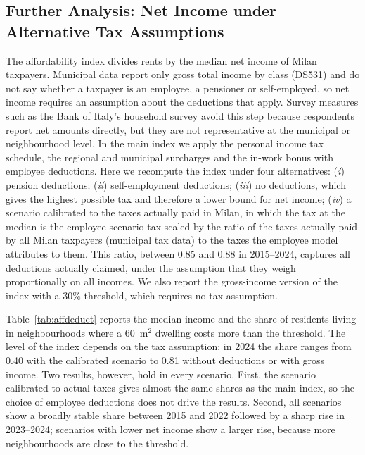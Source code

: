 
\subsection*{Further Analysis: Net Income under Alternative Tax Assumptions}

The affordability index divides rents by the median net income of Milan taxpayers. %
Municipal data report only gross total income by class (DS531) and do not say whether a taxpayer is an employee, a pensioner or self-employed, so net income requires an assumption about the deductions that apply. Survey measures such as the Bank of Italy's household survey avoid this step because respondents report net amounts directly, but they are not representative at the municipal or neighbourhood level. In the main index we apply the personal income tax schedule, the regional and municipal surcharges and the in-work bonus with employee deductions. Here we recompute the index under four alternatives: (\textit{i}) pension deductions; (\textit{ii}) self-employment deductions; (\textit{iii}) no deductions, which gives the highest possible tax and therefore a lower bound for net income; (\textit{iv}) a scenario calibrated to the taxes actually paid in Milan, in which the tax at the median is the employee-scenario tax scaled by the ratio of the taxes actually paid by all Milan taxpayers (municipal tax data) to the taxes the employee model attributes to them. This ratio, between 0.85 and 0.88 in 2015--2024, captures all deductions actually claimed, under the assumption that they weigh proportionally on all incomes. We also report the gross-income version of the index with a 30\% threshold, which requires no tax assumption.

Table~\ref{tab:affdeduct} reports the median income and the share of residents living in neighbourhoods where a 60~m$^2$ dwelling costs more than the threshold. The level of the index depends on the tax assumption: in 2024 the share ranges from 0.40 with the calibrated scenario to 0.81 without deductions or with gross income. Two results, however, hold in every scenario. First, the scenario calibrated to actual taxes gives almost the same shares as the main index, so the choice of employee deductions does not drive the results. Second, all scenarios show a broadly stable share between 2015 and 2022 followed by a sharp rise in 2023--2024; scenarios with lower net income show a larger rise, because more neighbourhoods are close to the threshold.

